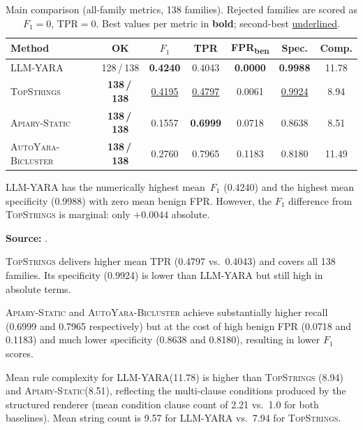 \documentclass[10pt,twocolumn]{article}
\newcommand{\sysname}{\textsc{LLM-YARA}\xspace}
\newcommand{\topstrings}{\textsc{TopStrings}\xspace}
\newcommand{\apiary}{\textsc{Apiary-Static}\xspace}
\newcommand{\autoyara}{\textsc{AutoYara-Bicluster}\xspace}
\begin{document}
\begin{table}[!b]
\centering
\caption{%
  Main comparison (all-family metrics, 138 families).
  Rejected families are scored as $F_1=0$, $\text{TPR}=0$.
  Best values per metric in \textbf{bold}; second-best \underline{underlined}.
}
\label{tab:main}
\scriptsize
\setlength{\tabcolsep}{3pt}
\begin{tabularx}{\columnwidth}{@{}Xcccccc@{}}
\toprule
\textbf{Method}
  & \textbf{OK}
  & \textbf{$F_1$}
  & \textbf{TPR}
  & \textbf{FPR\textsubscript{ben}}
  & \textbf{Spec.}
  & \textbf{Comp.} \\
\midrule
\sysname
  & 128\,/\,138
  & \textbf{0.4240}
  & 0.4043
  & \textbf{0.0000}
  & \textbf{0.9988}
  & 11.78 \\
\topstrings
  & \textbf{138\,/\,138}
  & \underline{0.4195}
  & \underline{0.4797}
  & 0.0061
  & \underline{0.9924}
  & \phantom{0}8.94 \\
\apiary
  & \textbf{138\,/\,138}
  & 0.1557
  & \textbf{0.6999}
  & 0.0718
  & 0.8638
  & \phantom{0}8.51 \\
\autoyara
  & \textbf{138\,/\,138}
  & 0.2760
  & 0.7965
  & 0.1183
  & 0.8180
  & 11.49 \\
\bottomrule
\end{tabularx}
\end{table}

\sysname has the numerically highest mean~$F_1$ (0.4240) and the highest
mean specificity (0.9988) with zero mean benign FPR.  However, the
$F_1$ difference from \topstrings is marginal: only $+0.0044$
absolute.

\smallskip
\noindent\textbf{Source: }.

\topstrings delivers higher mean TPR (0.4797 vs.\ 0.4043) and covers
all 138 families.  Its specificity (0.9924) is lower than \sysname
but still high in absolute terms.

\apiary and \autoyara achieve substantially higher recall (0.6999 and
0.7965 respectively) but at the cost of high benign FPR (0.0718 and
0.1183) and much lower specificity (0.8638 and 0.8180), resulting in
lower $F_1$ scores.

Mean rule complexity for \sysname (11.78) is higher than \topstrings
(8.94) and \apiary (8.51), reflecting the multi-clause conditions
produced by the structured renderer (mean condition clause count of
2.21 vs.\ 1.0 for both baselines).  Mean string count is 9.57 for
\sysname vs.\ 7.94 for \topstrings.
\end{document}
